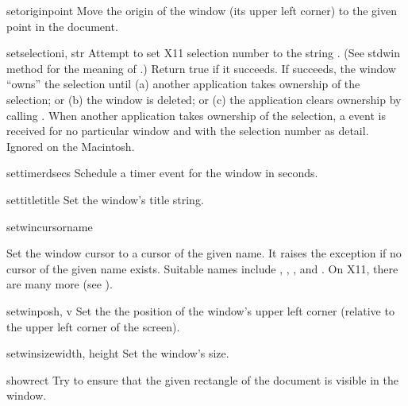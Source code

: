 \begin{funcdesc}{setorigin}{point}
Move the origin of the window (its upper left corner)
to the given point in the document.
\end{funcdesc}

\begin{funcdesc}{setselection}{i, str}
Attempt to set X11 selection number
to the string
.
(See stdwin method
for the meaning of
.)
Return true if it succeeds.
If  succeeds, the window ``owns'' the selection until
(a) another application takes ownership of the selection; or
(b) the window is deleted; or
(c) the application clears ownership by calling
.
When another application takes ownership of the selection, a
event is received for no particular window and with the selection number
as detail.
Ignored on the Macintosh.
\end{funcdesc}

\begin{funcdesc}{settimer}{dsecs}
Schedule a timer event for the window in
seconds.
\end{funcdesc}

\begin{funcdesc}{settitle}{title}
Set the window's title string.
\end{funcdesc}

\begin{funcdesc}{setwincursor}{name}
\begin{sloppypar}
Set the window cursor to a cursor of the given name.
It raises the
exception if no cursor of the given name exists.
Suitable names include
,
,
,
and
.
On X11, there are many more (see ).
\end{sloppypar}
\end{funcdesc}

\begin{funcdesc}{setwinpos}{h, v}
Set the the position of the window's upper left corner (relative to
the upper left corner of the screen).
\end{funcdesc}

\begin{funcdesc}{setwinsize}{width, height}
Set the window's size.
\end{funcdesc}

\begin{funcdesc}{show}{rect}
Try to ensure that the given rectangle of the document is visible in
the window.
\end{funcdesc}

